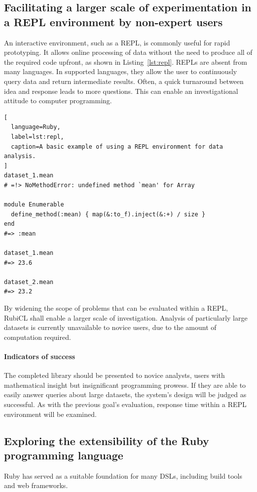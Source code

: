 \subsection{Facilitating a larger scale of experimentation in a REPL environment by non-expert users}

An interactive environment, such as a \ac{REPL}, is commonly useful for rapid prototyping. It allows online processing of data without the need to produce all of the required code upfront, as shown in Listing~\ref{lst:repl}. \acp{REPL} are absent from many languages. In supported languages, they allow the user to continuously query data and return intermediate results. Often, a quick turnaround between idea and response leads to more questions. This can enable an investigational attitude to computer programming.

\begin{lstlisting}[
  language=Ruby,
  label=lst:repl,
  caption=A basic example of using a REPL environment for data analysis.
]
dataset_1.mean
# =!> NoMethodError: undefined method `mean' for Array

module Enumerable
  define_method(:mean) { map(&:to_f).inject(&:+) / size }
end
#=> :mean

dataset_1.mean
#=> 23.6

dataset_2.mean
#=> 23.2
\end{lstlisting}

By widening the scope of problems that can be evaluated within a \ac{REPL}, RubiCL shall enable a larger scale of investigation. Analysis of particularly large datasets is currently unavailable to novice users, due to the amount of computation required.

\paragraph*{Indicators of success}
The completed library should be presented to novice analysts, users with mathematical insight but insignificant programming prowess. If they are able to easily answer queries about large datasets, the system's design will be judged as successful. As with the previous goal's evaluation, response time within a \ac{REPL} environment will be examined.

\subsection{Exploring the extensibility of the Ruby programming language}
Ruby has served as a suitable foundation for many \acp{DSL}, including build tools\cite{rake} and web frameworks\cite{sinatra}.

